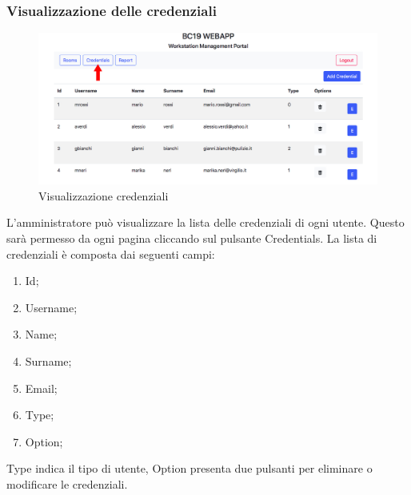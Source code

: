 \subsubsection{Visualizzazione delle credenziali}
\begin{figure}[H]
	\centering
	\includegraphics[width=15cm]{res/images/credential.jpg}
	\caption{Visualizzazione credenziali}
\end{figure}
L’amministratore può visualizzare la lista delle credenziali di ogni utente. Questo sarà permesso da ogni pagina cliccando sul pulsante Credentials.
La lista di credenziali è composta dai seguenti campi:
\begin{enumerate}
	\item Id;
	\item Username;
	\item Name;
	\item Surname;
	\item Email;
	\item Type;
	\item Option;
\end{enumerate}
Type indica il tipo di utente, Option presenta due pulsanti per eliminare o modificare le credenziali.

